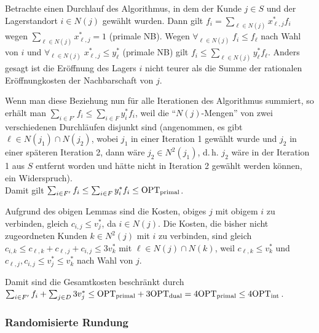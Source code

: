 \begin{Beweis}
    Betrachte einen Durchlauf des Algorithmus, in dem der Kunde $j \in S$ und
    der Lagerstandort $i \in N(j)$ gewählt wurden.
    Dann gilt
    $f_i = \sum_{\ell \in N(j)} x_{\ell,j}^\ast f_i$ wegen
    $\sum_{\ell \in N(j)} x_{\ell,j}^\ast = 1$ (primale NB).
    Wegen $\forall_{\ell \in N(j)}\; f_i \le f_\ell$ nach Wahl von $i$ und
    $\forall_{\ell \in N(j)}\; x_{\ell,j}^\ast \le y_\ell^\ast$ (primale NB) gilt
    $f_i \le \sum_{\ell \in N(j)} y_\ell^\ast f_\ell$.
    Anders gesagt ist die Eröffnung des Lagers $i$ nicht teurer als die
    Summe der rationalen Eröffnungkosten der Nachbarschaft von $j$.

    Wenn man diese Beziehung nun für alle Iterationen des Algorithmus summiert,
    so erhält man $\sum_{i \in F'} f_i \le \sum_{i \in F} y_i^\ast f_i$,
    weil die "`$N(j)$-Mengen"' von zwei verschiedenen Durchläufen disjunkt sind
    (angenommen, es gibt $\ell \in N(j_1) \cap N(j_2)$,
    wobei $j_1$ in einer Iteration 1 gewählt wurde und $j_2$ in einer späteren Iteration 2,
    dann wäre $j_2 \in N^2(j_1)$, d.\,h. $j_2$ wäre in der Iteration 1 aus $S$ entfernt worden
    und hätte nicht in Iteration 2 gewählt werden können, ein Widerspruch).\\
    Damit gilt $\sum_{i \in F'} f_i \le \sum_{i \in F} y_i^\ast f_i \le \text{OPT}_\text{primal}$.

    Aufgrund des obigen Lemmas sind die Kosten, obiges $j$ mit obigem $i$ zu verbinden,
    gleich $c_{i,j} \le v_j^\ast$, da $i \in N(j)$.
    Die Kosten, die bisher nicht zugeordneten Kunden $k \in N^2(j)$ mit $i$ zu verbinden,
    sind gleich $c_{i,k} \le c_{\ell,k} + c_{\ell,j} + c_{i,j} \le 3v_k^\ast$
    mit $\ell \in N(j) \cap N(k)$, weil $c_{\ell,k} \le v_k^\ast$ und
    $c_{\ell,j}, c_{i,j} \le v_j^\ast \le v_k^\ast$ nach Wahl von $j$.

    Damit sind die Gesamtkosten beschränkt durch\\
    $\sum_{i \in F'} f_i + \sum_{j \in D} 3v_j^\ast
    \le \text{OPT}_\text{primal} + 3\text{OPT}_\text{dual} = 4\text{OPT}_\text{primal} \le 4\text{OPT}_\text{int}$.
\end{Beweis}

\pagebreak

\subsubsection{%
    Randomisierte Rundung%
}

